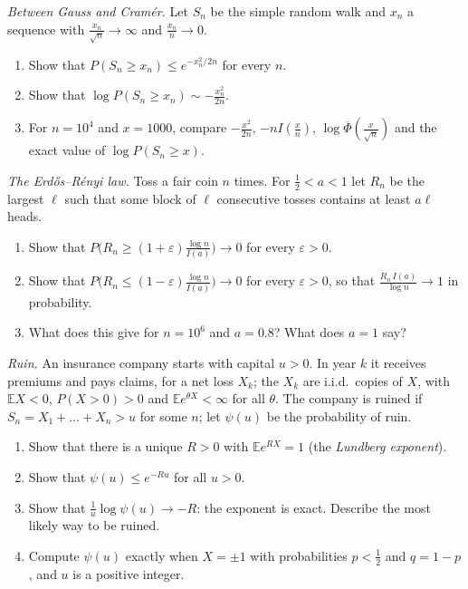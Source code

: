 \begin{exercise}[$\star\star$]\label{pb:moderate}
\emph{Between Gauss and Cram\'er.} Let $S_n$ be the simple random walk and $x_n$ a sequence with $\frac{x_n}{\sqrt n}\to\infty$ and $\frac{x_n}n\to0$.
\begin{enumerate}[label=(\alph*)]
\item Show that $P(S_n\ge x_n)\le e^{-x_n^2/2n}$ for every $n$.
\item Show that $\log P(S_n\ge x_n)\sim-\frac{x_n^2}{2n}$.
\item For $n=10^4$ and $x=1000$, compare $-\frac{x^2}{2n}$, $-nI(\frac xn)$, $\log\overline\Phi(\frac x{\sqrt n})$ and the exact value of $\log P(S_n\ge x)$.
\end{enumerate}
\end{exercise}

\begin{exercise}[$\star\star$]\label{pb:windows}
\emph{The Erd\H os--R\'enyi law.} Toss a fair coin $n$ times. For $\frac12<a<1$ let $R_n$ be the largest $\ell$ such that some block of $\ell$ consecutive tosses contains
at least $a\ell$ heads.
\begin{enumerate}[label=(\alph*)]
\item Show that $P\bigl(R_n\ge(1+\varepsilon)\frac{\log n}{I(a)}\bigr)\to0$ for every $\varepsilon>0$.
\item Show that $P\bigl(R_n\le(1-\varepsilon)\frac{\log n}{I(a)}\bigr)\to0$ for every $\varepsilon>0$, so that $\frac{R_n\,I(a)}{\log n}\to1$ in probability.
\item What does this give for $n=10^6$ and $a=0.8$? What does $a=1$ say?
\end{enumerate}
\end{exercise}

\begin{exercise}[$\star\star$]\label{pb:lundberg}
\emph{Ruin.} An insurance company starts with capital $u>0$. In year $k$ it receives premiums and pays claims, for a net loss $X_k$; the $X_k$ are i.i.d.\ copies of $X$, with
$\mathbb EX<0$, $P(X>0)>0$ and $\mathbb Ee^{\theta X}<\infty$ for all $\theta$. The company is ruined if $S_n=X_1+\dots+X_n>u$ for some $n$; let $\psi(u)$ be the probability of ruin.
\begin{enumerate}[label=(\alph*)]
\item Show that there is a unique $R>0$ with $\mathbb Ee^{RX}=1$ (the \emph{Lundberg exponent}).
\item Show that $\psi(u)\le e^{-Ru}$ for all $u>0$.
\item Show that $\frac1u\log\psi(u)\to-R$: the exponent is exact. Describe the most likely way to be ruined.
\item Compute $\psi(u)$ exactly when $X=\pm1$ with probabilities $p<\frac12$ and $q=1-p$, and $u$ is a positive integer.
\end{enumerate}
\end{exercise}

